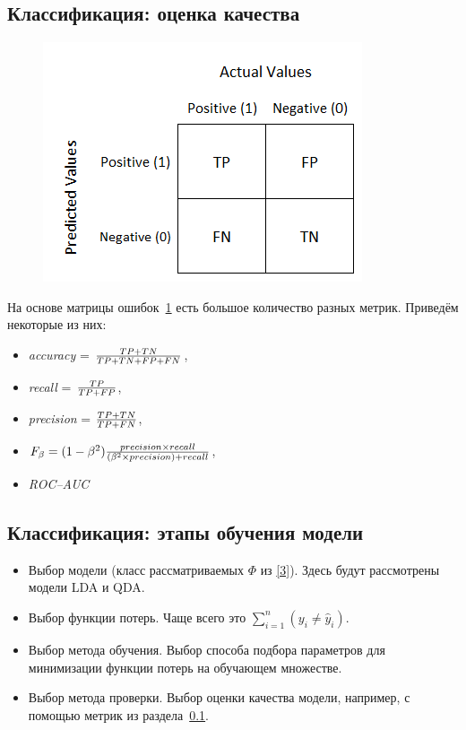 \documentclass[11pt, oneside]{article}   	%
\begin{document}
		\subsection{Классификация: оценка качества}
		\label{metrics}
		\begin{figure}
			\includegraphics[width=0.7\linewidth]{imgs/conf_matrix}
			\label{conf_matrix}
			
		\end{figure}
	    На основе матрицы ошибок~\ref{conf_matrix} есть большое количество разных метрик. Приведём некоторые из них: 
	    \begin{itemize}
	    	\item\textit{accuracy} = ${TP + TN}\over{TP+TN+FP+FN}$, 
	    	\item\textit{recall} = ${TP}\over{TP+FP}$, 
	    	\item\textit{precision} = ${TP + TN}\over{TP+FN}$, 
	    	\item $F_\beta = (1-\beta^2) {{precision \times recall}\over{(\beta^2 \times precision) + recall}}$, 
	    	\item\textit{ROC--AUC}
	    \end{itemize}


		\subsection{Классификация: этапы обучения модели}
		\begin{itemize}
			\item Выбор модели (класс рассматриваемых $\Phi$ из \ref{3}).
					 Здесь будут рассмотрены модели LDA и QDA. 
			\item Выбор функции потерь.
					 Чаще всего это $\sum_{i=1}^{n}(y_i \neq \widehat{y}_i)$.
			\item Выбор метода обучения.
			 		Выбор способа подбора параметров для минимизации функции потерь на обучающем множестве.
			\item Выбор метода проверки.
			 		Выбор оценки качества модели, например, с помощью метрик из раздела~\ref{metrics}.
		\end{itemize}
\end{document}
